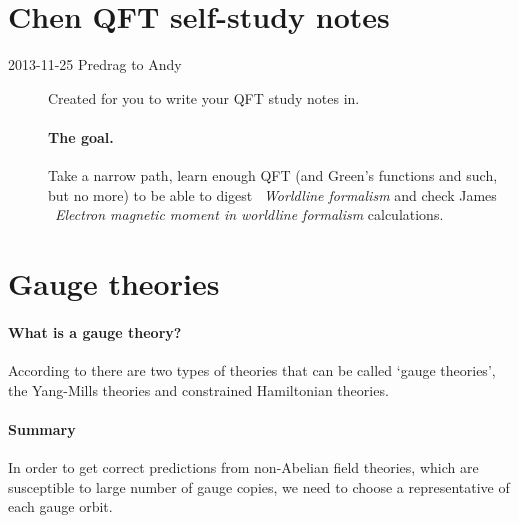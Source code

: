 
\section{Chen QFT self-study notes}
\label{c-dailyBlogAC}


\begin{description}
\item[2013-11-25  Predrag to Andy] Created  for
    you to write your QFT study notes in.

\paragraph{The goal.}
    Take a narrow path, learn enough QFT (and Green's functions and such, but
    no more) to be able to digest ~{\em Worldline
    formalism} and check James ~{\em Electron
    magnetic moment in worldline formalism} calculations.


\end{description}


\section{Gauge theories}

 \paragraph{What is a gauge theory?}
According to there are two types of theories
that can be called \lq gauge theories\rq, the Yang-Mills theories and
constrained Hamiltonian theories.

\paragraph{Summary}
In order to get correct predictions from non-Abelian field theories,
which are susceptible to large number of gauge copies, we need to choose
a representative of each gauge orbit.

\printbibliography[heading=subbibintoc,title={References}]


\renewcommand{\ssp}{a}
